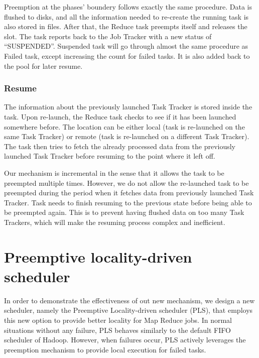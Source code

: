 \documentclass[runningheads,a4paper]{llncs}
\begin{document}
Preemption at the phases’ boundery follows exactly the same procedure. Data is flushed to disks, and all the information needed to re-create the running task is also stored in files. After that, the Reduce task preempts itself and releases the slot. The task reports back to the Job Tracker with a new status of “SUSPENDED”. Suspended task will go through almost the same procedure as Failed task, except increasing the count for failed tasks. It is also added back to the pool for later resume.

\subsubsection{Resume}

The information about the previously launched Task Tracker is stored inside the task. Upon re-launch, the Reduce task checks to see if it has been launched somewhere before. The location can be either local (task is re-launched on the same Task Tracker) or remote (task is re-launched on a different Task Tracker). The task then tries to fetch the already processed data from the previously launched Task Tracker before resuming to the point where it left off.

Our mechanism is incremental in the sense that it allows the task to be preempted multiple times. However, we do not allow the re-launched task to be preempted during the period when it fetches data from previously launched Task Tracker. Task needs to finish resuming to the previous state before being able to be preempted again. This is to prevent having flushed data on too many Task Trackers, which will make the resuming process complex and inefficient.

\section {Preemptive locality-driven scheduler}
In order to demonstrate the effectiveness of out new mechanism, we design a new scheduler, namely the Preemptive Locality-driven scheduler (PLS), that employs this new option to provide better locality for Map Reduce jobs. In normal situations without any failure, PLS behaves similarly to the default FIFO scheduler of Hadoop. However, when failures occur, PLS actively leverages the preemption mechanism to provide local execution for failed tasks.
\end{document}

